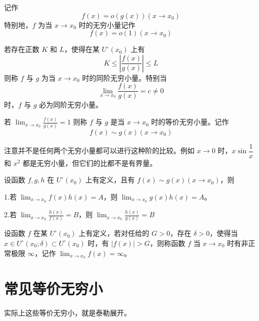 记作
$$f(x)=o(g(x))(x\to x_0)$$
特别地，$f$ 为当 $x\to x_0$ 时的无穷小量记作
$$f(x)=o(1)(x\to x_0)$$

若存在正数 $K$ 和 $L$，使得在某 $U^\circ(x_0)$ 上有
$$K\leqslant \left|\frac{f(x)}{g(x)}\right| \leqslant L$$
则称 $f$ 与 $g$ 为当 $x\to x_0$ 时的同阶无穷小量。特别当
$$\lim_{x\to x_0}\frac{f(x)}{g(x)} = c \ne 0$$
时，$f$ 与 $g$ 必为同阶无穷小量。

若 $\displaystyle\lim_{x\to x_0}\frac{f(x)}{g(x)} = 1$ 则称 $f$ 与 $g$ 是当 $x\to x_0$ 时的等价无穷小量。记作
$$f(x) \sim g(x) (x\to x_0)$$

注意并不是任何两个无穷小量都可以进行这种阶的比较。例如 $x\to 0$ 时，$x\sin\dfrac{1}{x}$ 和 $x^2$ 都是无穷小量，但它们的比都不是有界量。

\begin{theorem}
	设函数 $f,g,h$ 在 $U^\circ(x_0)$ 上有定义，且有 $f(x) \sim g(x)(x\to x_0)$，则

	1.若 $\displaystyle\lim_{x\to x_0}f(x)h(x) = A$，则 $\displaystyle\lim_{x\to x_0}g(x)h(x) = A$。

	2.若 $\displaystyle\lim_{x\to x_0}\frac{h(x)}{f(x)}=B$，则 $\displaystyle\lim_{x\to x_0}\frac{h(x)}{g(x)}=B$
\end{theorem}

\begin{definition}[无穷大量]
	设函数 $f$ 在某 $U^\circ(x_0)$ 上有定义，若对任给的 $G>0$，存在 $\delta>0$，使得当 $x\in U^\circ(x_0;\delta)\subset U^\circ(x_0)$ 时，有 $|f(x)|>G$，则称函数 $f$ 当 $x\to x_0$ 时有非正常极限 $\infty$，记作 $\lim_{x\to x_0}f(x) = \infty$。
\end{definition}

\section{常见等价无穷小}

实际上这些等价无穷小，就是泰勒展开。

